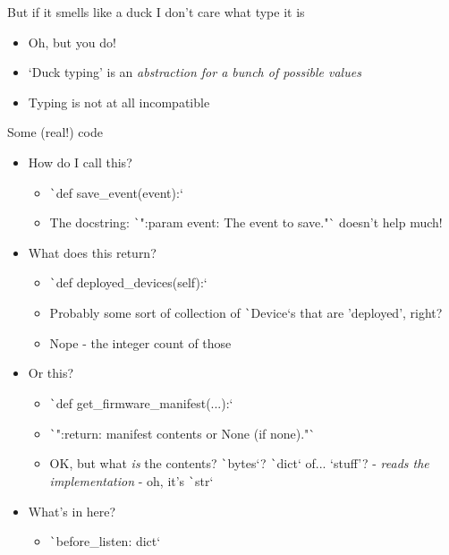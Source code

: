 \documentclass[10pt]{beamer}
\begin{document}
\begin{frame}{But if it smells like a duck I don't care what type it is}
    \pause\begin{itemize}[<+->]
        \item Oh, but you do!
        \item `Duck typing' is an \emph{abstraction for a bunch of possible values} 
        \item Typing is not at all incompatible
    \end{itemize}
\end{frame}

\begin{frame}{Some (real!) code}
    \pause\begin{itemize}[<+->]
        \item How do I call this?
        \begin{itemize}
            \item \texttt`def save_event(event):`
            \item The docstring: \texttt`":param event: The event to save."` doesn't help much!
        \end{itemize}
        \item What does this return?
        \begin{itemize}
            \item \texttt`def deployed_devices(self):`
            \item Probably some sort of collection of \texttt`Device`s that are 'deployed', right?
            \item Nope - the integer count of those
        \end{itemize}
        \item Or this?
        \begin{itemize}
            \item \texttt`def get_firmware_manifest(...):`
            \item \texttt`":return: manifest contents or None (if none)."`
            \item OK, but what \textit{is} the contents? \texttt`bytes`? \texttt`dict` of... `stuff'?  - \textit{reads the implementation} - oh, it's \texttt`str`
        \end{itemize}
        \item What's in here?
        \begin{itemize}
            \item \texttt`before_listen: dict`
        \end{itemize}
    \end{itemize}
\end{frame}
\end{document}
